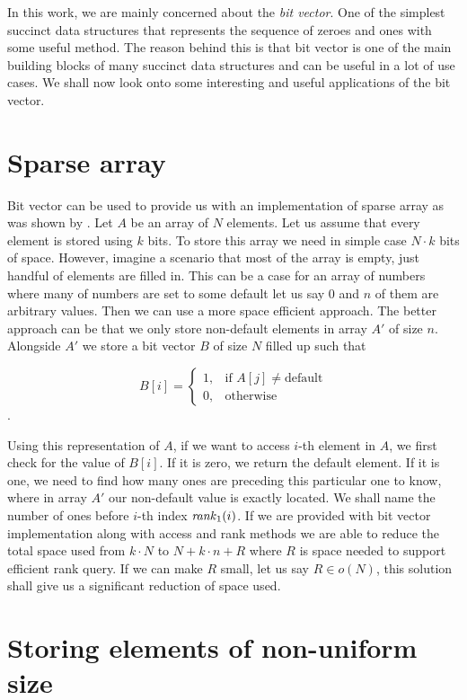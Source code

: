 In this work, we are mainly concerned about the \textit{bit vector}. One of the simplest
succinct data structures that represents the sequence of zeroes and ones with some
useful method. The reason behind this is that bit vector is one of the main building blocks
of many succinct data structures and can be useful in a lot of use cases. We shall now look
onto some interesting and useful applications of the bit vector. 

\section{Sparse array}

Bit vector can be used to provide us with an implementation of sparse array as was shown
by \cite{grossi2013design}. Let $A$ be an array of $N$ elements. Let us assume that every
element is stored using $k$ bits. To store this array we need in simple case $N\cdot k$ bits
of space. However, imagine a scenario that most of the array is empty, just handful of elements
are filled in. This can be a case for an array of numbers where many of numbers are set to
some default let us say 0 and $n$ of them are arbitrary values. Then we can use a more space
efficient approach. The better approach can be that we only store non-default elements in array
$A'$ of size $n$. Alongside $A'$ we store a bit vector $B$ of size $N$ filled up such that

\[
    B[i]= 
\begin{cases}
	1,& \text{if } A[j]\neq \text{default} \\
    0,& \text{otherwise}
\end{cases}
\].

Using this representation of $A$, if we want to access $i$-th element in $A$, we first check for
the value of $B[i]$. If it is zero, we return the default element. If it is one, we need to find
how many ones are preceding this particular one to know, where in array $A'$ our non-default
value is exactly located. We shall name the number of ones before $i$-th index
$\mathit{rank}_1(i)$. If we are provided with bit vector implementation along with access and
rank methods we are able to reduce the total space used from $k\cdot N$ to $N+k\cdot n+R$ where
$R$ is space needed to support efficient rank query. If we can make $R$ small, let us say
$R\in o(N)$, this solution shall give us a significant reduction of space used.

\section{Storing elements of non-uniform size}

